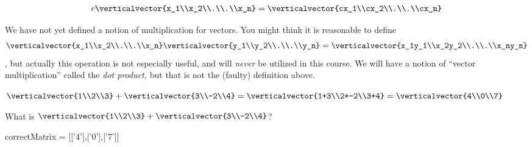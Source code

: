 \documentclass{ximera}
\begin{document}
\[ c\verticalvector{x_1\\x_2\\.\\.\\x_n} = \verticalvector{cx_1\\cx_2\\.\\.\\cx_n} \]
 	 
\begin{warning}
  We have not yet defined a notion of multiplication for vectors.  You might think it is reasonable to define 
  \[\verticalvector{x_1\\x_2\\.\\.\\x_n} \verticalvector{y_1\\y_2\\.\\.\\y_n}=\verticalvector{x_1y_1\\x_2y_2\\.\\.\\x_ny_n}\], but 
  actually this operation is not especially useful, and will \textit{never} be utilized in this course.  We will have a notion of ``vector multiplication'' called the \textit{dot product,} but that is not the (faulty) definition above.
\end{warning}

\begin{question}
  \begin{solution}
    \begin{hint}
      $\verticalvector{1\\2\\3}+\verticalvector{3\\-2\\4} = \verticalvector{1+3\\2+-2\\3+4} = \verticalvector{4\\0\\7}$
    \end{hint}
    What is $\verticalvector{1\\2\\3}+\verticalvector{3\\-2\\4}$?
    
    \begin{matrix-answer}[name=v]
      correctMatrix = [['4'],['0'],['7']]
    \end{matrix-answer}
  \end{solution}
\end{question}
 	
\end{document}
